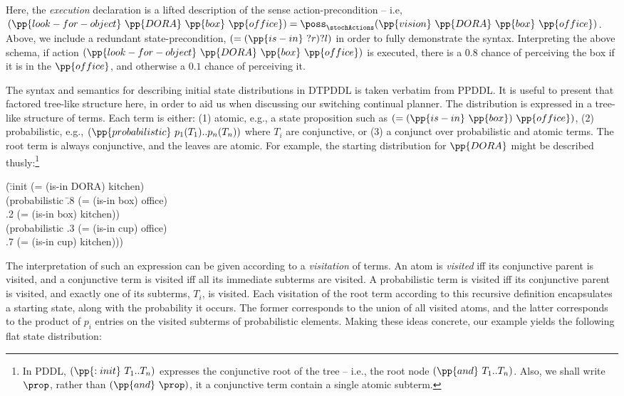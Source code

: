 \noindent Here, the {\em execution} declaration is a lifted description of
the sense action-precondition -- i.e,
$(\pp{look-for-object}~\pp{DORA}~\pp{box}~\pp{office}) =
\poss_\stochActions(\pp{vision}~\pp{DORA}~\pp{box}~\pp{office})$. Above,
we include a redundant state-precondition, $(=(\pp{is-in}~?r)?l)$ in
order to fully demonstrate the syntax. Interpreting the above schema,
if action $(\pp{look-for-object}~\pp{DORA}~\pp{box}~\pp{office})$ is
executed, there is a $0.8$ chance of perceiving the box if it is in
the $\pp{office}$, and otherwise a $0.1$ chance of perceiving it.

The syntax and semantics for describing initial state distributions in
DTPDDL is taken verbatim from PPDDL. It is useful to present that
factored tree-like structure here, in order to aid us when discussing
our switching continual planner. The distribution is expressed in a
tree-like structure of terms. Each term is either: (1) atomic, e.g., a
state proposition such as $(=(\pp{is-in}~\pp{box})~\pp{office})$,
(2) probabilistic, e.g., $(\pp{probabilistic}~p_1 (T_1) .. p_n (T_n))$
where $T_i$ are conjunctive, or (3) a conjunct over probabilistic and
atomic terms. The root term is always conjunctive, and the leaves are
atomic. For example, the starting distribution for $\pp{DORA}$ might
be described thusly:\footnote{In PDDL, $(\pp{:init}~T_1..T_n)$
expresses the conjunctive root of the tree -- i.e., the root node
$(\pp{and}~T_1..T_n)$. Also, we shall write $\prop$, rather than
$(\pp{and}~\prop)$, it a conjunctive term contain a single atomic
subterm.}

\small
\begin{tabtt}
(\=:init (= (is-in DORA) kitchen) \+ \\
       (probabilistic \=.8 (= (is-in box) office)  \\
		      \>.2 (= (is-in box) kitchen)) \\
       (probabilistic .3 (= (is-in cup) office)  \\
		      \>.7 (= (is-in cup) kitchen))) \\
\end{tabtt}
\normalsize


\noindent The interpretation of such an expression can be given
according to a {\em visitation} of terms. An atom is {\em visited} iff
its conjunctive parent is visited, and a conjunctive term is visited
iff all its immediate subterms are visited. A probabilistic term is
visited iff its conjunctive parent is visited, and exactly one of its
subterms, $T_i$, is visited. Each visitation of the root term
according to this recursive definition encapsulates a starting state,
along with the probability it occurs. The former corresponds to the
union of all visited atoms, and the latter corresponds to the product
of $p_i$ entries on the visited subterms of probabilistic
elements. Making these ideas concrete, our example yields the
following flat state distribution:



